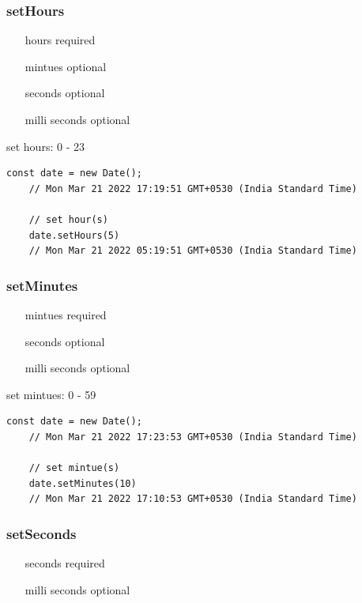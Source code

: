 \documentclass[10pt]{article}
\begin{document}
\subsubsection{setHours}
\begin{itemize}
	\color{red}
	\item[hours] required
	\color{forestgreen}
	
	\item[mintues] optional
	
	\item[seconds] optional
	
	\item[milli seconds] optional
\end{itemize}

set hours: 0 - 23

\begin{lstlisting}[style=ES6, caption={Date methods - hour(s)}]
	const date = new Date();
	// Mon Mar 21 2022 17:19:51 GMT+0530 (India Standard Time)
	
	// set hour(s)
	date.setHours(5)
	// Mon Mar 21 2022 05:19:51 GMT+0530 (India Standard Time)
\end{lstlisting}

\subsubsection{setMinutes}
\begin{itemize}
	\color{red}
	\item[mintues] required
	\color{forestgreen}

	\item[seconds] optional
	
	\item[milli seconds] optional
\end{itemize}

set mintues: 0 - 59

\begin{lstlisting}[style=ES6, caption={Date methods - mintue(s)}]
	const date = new Date();
	// Mon Mar 21 2022 17:23:53 GMT+0530 (India Standard Time)
	
	// set mintue(s)
	date.setMinutes(10)
	// Mon Mar 21 2022 17:10:53 GMT+0530 (India Standard Time)
\end{lstlisting}

\subsubsection{setSeconds}
\begin{itemize}
	\color{red}
	\item[seconds] required
	\color{forestgreen}
	
	\item[milli seconds] optional
\end{itemize}
\end{document}
